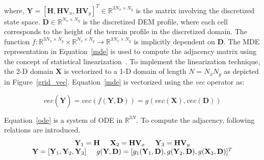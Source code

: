 \noindent where, $\textbf{Y} = [\textbf{H}, \textbf{HV}_x, \textbf{HV}_y]^T \in \mathbb{R}^{3N_x \times N_y}$ is the matrix involving the discretized state space. $\textbf{D} \in \mathbb{R}^{N_x \times N_y}$ is the discretized DEM profile, where each cell corresponds to the height of the terrain profile in the discretized domain. The function $f:\mathbb{R}^{3N_x \times N_y} \times \mathbb{R}^{N_x \times N_y} \rightarrow \mathbb{R}^{3N_x \times N_y}$ is implicitly dependent on $\textbf{D}$. The MDE representation in Equation~\ref{mde} is used to compute the adjacency matrix using the concept of statistical linearization~\cite{Mukherjee_2017,roberts2003random,banaszuk2011scalable}. To implement the linearization technique, the 2-D domain $\textbf{X}$ is vectorized to a 1-D domain of length $N = N_x N_y$ as depicted in  Figure~\ref{grid_vec}. Equation~\ref{mde} is vectorized using the \textit{vec} operator as:

\begin{equation}
\label{ode}
vec(\dot{\textbf{Y}}) = vec\left(f(\textbf{Y}, \textbf{D}) \right) = g(vec(\textbf{X}), vec(\textbf{D}))
\end{equation}

\noindent Equation~\ref{ode} is a system of ODE in $\mathbb{R}^{3N}$. To compute the adjacency, following relations are introduced. 
\begin{equation}
\begin{array}{c}
\textbf{Y}_1 = \textbf{H} \hspace{5mm} \textbf{X}_2 = \textbf{HV}_x \hspace{5mm} \textbf{Y}_3 = \textbf{HV}_y \\
\textbf{Y} = [\textbf{Y}_1, \textbf{Y}_2, \textbf{Y}_3] \hspace{5mm} g(\textbf{Y},\textbf{D}) = [g_1(\textbf{Y}_1,\textbf{D}), g(\textbf{Y}_2,\textbf{D}), g(\textbf{X}_3,\textbf{D})]^T
\end{array}
\end{equation}

